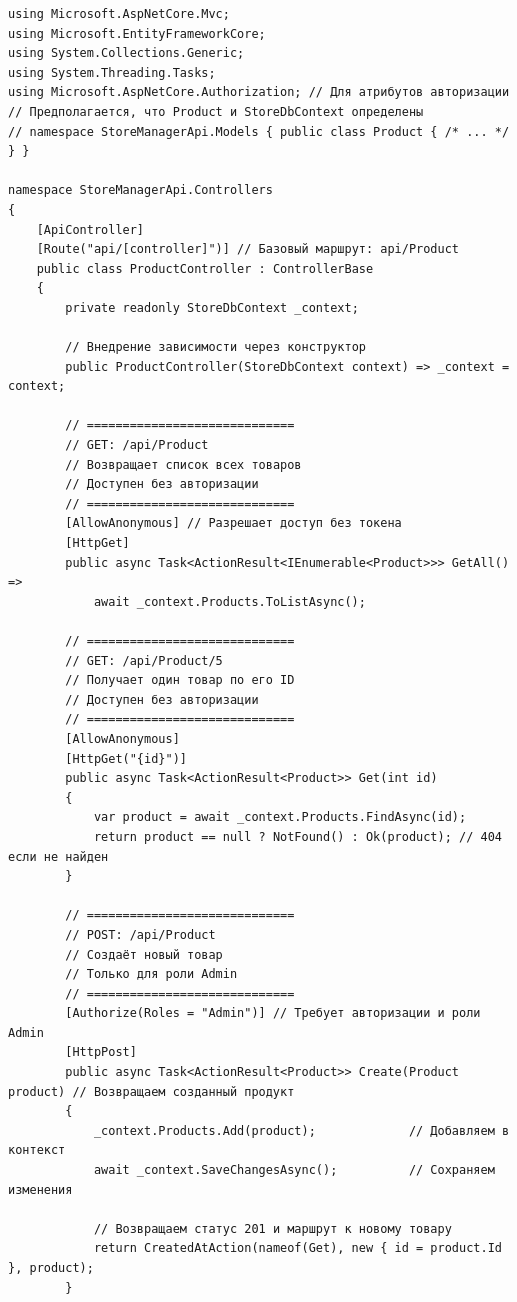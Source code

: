 \documentclass[12pt]{article}
\newenvironment{code}
  {\par\captionsetup{type=listing}\noindent}
  {\par\vspace{\baselineskip}}
\numberwithin{listing}{section}
\numberwithin{figure}{section}
\begin{document}
\begin{code}
	\begin{verbatim}
using Microsoft.AspNetCore.Mvc;
using Microsoft.EntityFrameworkCore;
using System.Collections.Generic;
using System.Threading.Tasks;
using Microsoft.AspNetCore.Authorization; // Для атрибутов авторизации
// Предполагается, что Product и StoreDbContext определены
// namespace StoreManagerApi.Models { public class Product { /* ... */ } }

namespace StoreManagerApi.Controllers
{
    [ApiController]
    [Route("api/[controller]")] // Базовый маршрут: api/Product
    public class ProductController : ControllerBase
    {
        private readonly StoreDbContext _context;

        // Внедрение зависимости через конструктор
        public ProductController(StoreDbContext context) => _context = context;

        // =============================
        // GET: /api/Product
        // Возвращает список всех товаров
        // Доступен без авторизации
        // =============================
        [AllowAnonymous] // Разрешает доступ без токена
        [HttpGet]
        public async Task<ActionResult<IEnumerable<Product>>> GetAll() =>
            await _context.Products.ToListAsync();

        // =============================
        // GET: /api/Product/5
        // Получает один товар по его ID
        // Доступен без авторизации
        // =============================
        [AllowAnonymous]
        [HttpGet("{id}")]
        public async Task<ActionResult<Product>> Get(int id)
        {
            var product = await _context.Products.FindAsync(id);
            return product == null ? NotFound() : Ok(product); // 404 если не найден
        }

        // =============================
        // POST: /api/Product
        // Создаёт новый товар
        // Только для роли Admin
        // =============================
        [Authorize(Roles = "Admin")] // Требует авторизации и роли Admin
        [HttpPost]
        public async Task<ActionResult<Product>> Create(Product product) // Возвращаем созданный продукт
        {
            _context.Products.Add(product);             // Добавляем в контекст
            await _context.SaveChangesAsync();          // Сохраняем изменения

            // Возвращаем статус 201 и маршрут к новому товару
            return CreatedAtAction(nameof(Get), new { id = product.Id }, product);
        }


\end{verbatim}
\end{code}
\end{document}
